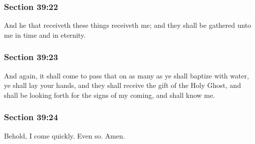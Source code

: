 	\subsubsection{Section 39:22} %
		\label{DC39-22}

		And he that receiveth these things receiveth me; and they shall be gathered unto me in time and in eternity.


	\subsubsection{Section 39:23} %
		\label{DC39-23}

		And again, it shall come to pass that on as many as ye shall baptize with water, ye shall lay your hands, and they shall receive the gift of the Holy Ghost, and shall be looking forth for the signs of my coming, and shall know me.


	\subsubsection{Section 39:24} %
		\label{DC39-24}

		Behold, I come quickly.  Even so.  Amen.

